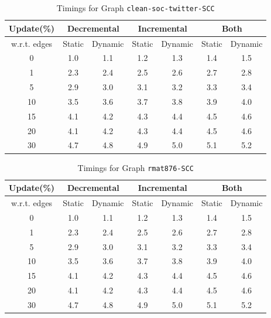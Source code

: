 \begin{table}[H]
    \centering
    \caption{Timings for Graph \texttt{clean-soc-twitter-SCC} }
    \begin{tabular}{|c|c|c|c|c|c|c|}
        \hline
        \textbf{Update(\%)} & \multicolumn{2}{c|}{\textbf{Decremental}} & \multicolumn{2}{c|}{\textbf{Incremental}} & \multicolumn{2}{c|}{\textbf{Both}} \\
        \hline
        w.r.t. edges & Static &  Dynamic & Static & Dynamic & Static & Dynamic \\
        \hline
        0 & 1.0 & 1.1 & 1.2 & 1.3 & 1.4 & 1.5 \\
        1 & 2.3 & 2.4 & 2.5 & 2.6 & 2.7 & 2.8 \\
        5 & 2.9 & 3.0 & 3.1 & 3.2 & 3.3 & 3.4 \\
        10 & 3.5 & 3.6 & 3.7 & 3.8 & 3.9 & 4.0 \\
        15 & 4.1 & 4.2 & 4.3 & 4.4 & 4.5 & 4.6 \\
        20 & 4.1 & 4.2 & 4.3 & 4.4 & 4.5 & 4.6 \\
        30 & 4.7 & 4.8 & 4.9 & 5.0 & 5.1 & 5.2 \\
        \hline
    \end{tabular}
    \label{tab:timed_results_g6}
\end{table}

\begin{table}[H]
    \centering
    \caption{Timings for Graph \texttt{rmat876-SCC} }
    \begin{tabular}{|c|c|c|c|c|c|c|}
        \hline
        \textbf{Update(\%)} & \multicolumn{2}{c|}{\textbf{Decremental}} & \multicolumn{2}{c|}{\textbf{Incremental}} & \multicolumn{2}{c|}{\textbf{Both}} \\
        \hline
        w.r.t. edges & Static &  Dynamic & Static & Dynamic & Static & Dynamic \\
        \hline
        0 & 1.0 & 1.1 & 1.2 & 1.3 & 1.4 & 1.5 \\
        1 & 2.3 & 2.4 & 2.5 & 2.6 & 2.7 & 2.8 \\
        5 & 2.9 & 3.0 & 3.1 & 3.2 & 3.3 & 3.4 \\
        10 & 3.5 & 3.6 & 3.7 & 3.8 & 3.9 & 4.0 \\
        15 & 4.1 & 4.2 & 4.3 & 4.4 & 4.5 & 4.6 \\
        20 & 4.1 & 4.2 & 4.3 & 4.4 & 4.5 & 4.6 \\
        30 & 4.7 & 4.8 & 4.9 & 5.0 & 5.1 & 5.2 \\
        \hline
    \end{tabular}
    \label{tab:timed_results_g7}
\end{table}


